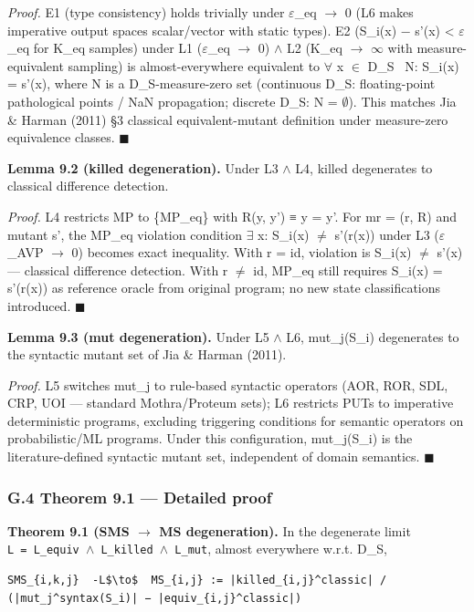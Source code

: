 \documentclass[review,12pt,authoryear]{elsarticle}
\begin{document}
\emph{Proof.} E1 (type consistency) holds trivially under $\varepsilon$\_eq $\to$ 0 (L6
makes imperative output spaces scalar/vector with static types). E2
(\textbar S\_i(x) − s'(x)\textbar{} \textless{} $\varepsilon$\_eq for K\_eq samples)
under L1 ($\varepsilon$\_eq $\to$ 0) $\wedge$ L2 (K\_eq $\to$ $\infty$ with measure-equivalent sampling)
is almost-everywhere equivalent to $\forall$ x $\in$ D\_S ~N: S\_i(x) = s'(x), where
N is a D\_S-measure-zero set (continuous D\_S: floating-point
pathological points / NaN propagation; discrete D\_S: N = $\emptyset$). This
matches Jia \& Harman (2011) §3 classical equivalent-mutant definition
under measure-zero equivalence classes. $\blacksquare$

\textbf{Lemma 9.2 (killed degeneration).} Under L3 $\wedge$ L4, killed
degenerates to classical difference detection.

\emph{Proof.} L4 restricts MP to \{MP\_eq\} with R(y, y') ≡ y = y'. For
mr = (r, R) and mutant s', the MP\_eq violation condition $\exists$ x: S\_i(x) $\neq$
s'(r(x)) under L3 ($\varepsilon$\_AVP $\to$ 0) becomes exact inequality. With r = id,
violation is S\_i(x) $\neq$ s'(x) --- classical difference detection. With r
$\neq$ id, MP\_eq still requires S\_i(x) = s'(r(x)) as reference oracle from
original program; no new state classifications introduced. $\blacksquare$

\textbf{Lemma 9.3 (mut degeneration).} Under L5 $\wedge$ L6, mut\_j(S\_i)
degenerates to the syntactic mutant set of Jia \& Harman (2011).

\emph{Proof.} L5 switches mut\_j to rule-based syntactic operators (AOR,
ROR, SDL, CRP, UOI --- standard Mothra/Proteum sets); L6 restricts PUTs
to imperative deterministic programs, excluding triggering conditions
for semantic operators on probabilistic/ML programs. Under this
configuration, mut\_j(S\_i) is the literature-defined syntactic mutant
set, independent of domain semantics. $\blacksquare$

\subsubsection{G.4 Theorem 9.1 --- Detailed
proof}\label{g.4-theorem-9.1-detailed-proof}

\textbf{Theorem 9.1 (SMS $\to$ MS degeneration).} In the degenerate limit
\texttt{L\ =\ L\_equiv\ $\wedge$\ L\_killed\ $\wedge$\ L\_mut}, almost everywhere
w.r.t. D\_S,

\begin{verbatim}
SMS_{i,k,j}  -L$\to$  MS_{i,j} := |killed_{i,j}^classic| / (|mut_j^syntax(S_i)| − |equiv_{i,j}^classic|)
\end{verbatim}
\end{document}
